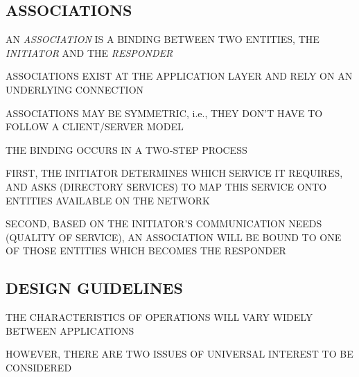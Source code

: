 \begin{bwslide}
\part*	{ASSOCIATIONS}\bf

\begin{nrtc}
\item	AN \emph{ASSOCIATION} IS A BINDING BETWEEN TWO ENTITIES,
	THE \emph{INITIATOR} AND THE \emph{RESPONDER}

\item	ASSOCIATIONS EXIST AT THE APPLICATION LAYER AND
	RELY ON AN UNDERLYING CONNECTION

\item	ASSOCIATIONS MAY BE SYMMETRIC, i.e., THEY DON'T HAVE TO FOLLOW A
	CLIENT/SERVER MODEL
\end{nrtc}
\end{bwslide}


\begin{bwslide}

\begin{nrtc}
\item	THE BINDING OCCURS IN A TWO-STEP PROCESS

\item	FIRST, THE INITIATOR DETERMINES WHICH SERVICE IT REQUIRES,
	AND ASKS (DIRECTORY SERVICES) TO MAP THIS SERVICE ONTO
	ENTITIES AVAILABLE ON THE NETWORK

\item	SECOND, BASED ON THE INITIATOR'S COMMUNICATION NEEDS
	(QUALITY OF SERVICE), AN ASSOCIATION WILL BE BOUND TO ONE OF
	THOSE ENTITIES WHICH BECOMES THE RESPONDER
\end{nrtc}
\end{bwslide}


\begin{bwslide}
\part*	{DESIGN GUIDELINES}\bf

\begin{nrtc}
\item	THE CHARACTERISTICS OF OPERATIONS WILL VARY WIDELY BETWEEN APPLICATIONS

\item	HOWEVER, THERE ARE TWO ISSUES OF UNIVERSAL INTEREST TO BE CONSIDERED
\end{nrtc}
\end{bwslide}


